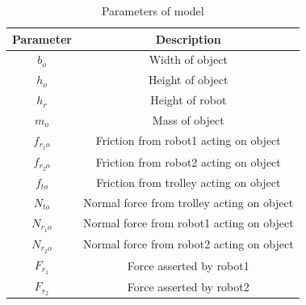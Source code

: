    

\begin{table}[tb]
\caption{Parameters of model}
\centering
\begin{tabular}{c|c}
\hline
Parameter & Description                   \\ \hline\hline
$b_o$       & Width of object              \\ \hline
$h_o$      & Height of object               \\ \hline
$h_r$      & Height of robot               \\ \hline
$m_o$     & Mass of object        \\ \hline
$f_{r_1 o}$       & Friction from robot1 acting on object                 \\ \hline
$f_{r_2 o}$ & Friction from robot2 acting on object                 \\ \hline
$f_{t o}$ & Friction from trolley acting on object                 \\ \hline
$N_{t o}$ & Normal force from trolley acting on object                 \\ \hline
$N_{r_1 o}$ & Normal force from robot1 acting on object                 \\ \hline
$N_{r_2 o}$ & Normal force from robot2 acting on object                 \\ \hline
$F_{r_1}$ & Force asserted by robot1                 \\ \hline
$F_{r_2}$ & Force asserted by robot2                 \\ \hline
\end{tabular}
\label{tab:model-parameter}
\end{table}

